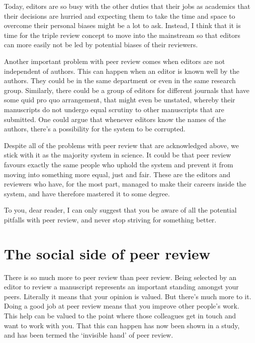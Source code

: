 \documentclass[
]{krantz}
\begin{document}
Today, editors are so busy with the other duties that their jobs as academics that their decisions are hurried and expecting them to take the time and space to overcome their personal biases might be a lot to ask. Instead, I think that it is time for the triple review concept to move into the mainstream so that editors can more easily not be led by potential biases of their reviewers.

Another important problem with peer review comes when editors are not independent of authors. This can happen when an editor is known well by the authors. They could be in the same department or even in the same research group. Similarly, there could be a group of editors for different journals that have some quid pro quo arrangement, that might even be unstated, whereby their manuscripts do not undergo equal scrutiny to other manuscripts that are submitted. One could argue that whenever editors know the names of the authors, there's a possibility for the system to be corrupted.

Despite all of the problems with peer review that are acknowledged above, we stick with it as the majority system in science. It could be that peer review favours exactly the same people who uphold the system and prevent it from moving into something more equal, just and fair. These are the editors and reviewers who have, for the most part, managed to make their careers inside the system, and have therefore mastered it to some degree.

To you, dear reader, I can only suggest that you be aware of all the potential pitfalls with peer review, and never stop striving for something better.

\hypertarget{the-social-side-of-peer-review}{%
\section{The social side of peer review}\label{the-social-side-of-peer-review}}

There is so much more to peer review than peer review. Being selected by an editor to review a manuscript represents an important standing amongst your peers. Literally it means that your opinion is valued. But there's much more to it. Doing a good job at peer review means that you improve other people's work. This help can be valued to the point where those colleagues get in touch and want to work with you. That this can happen has now been shown in a study, and has been termed the `invisible hand' of peer review.
\end{document}
